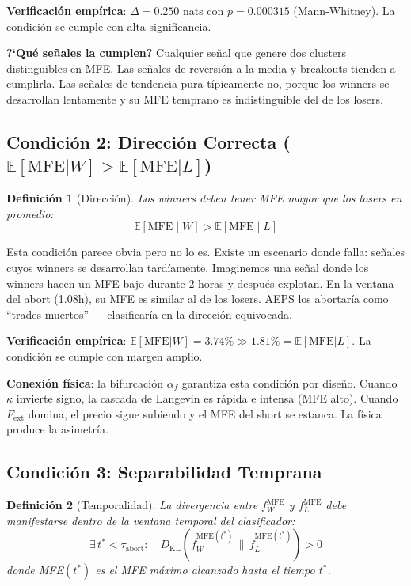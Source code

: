 \documentclass[11pt,a4paper]{article}
\newtheorem{definition}{Definici\'on}[section]
\newcommand{\E}{\mathbb{E}}
\newcommand{\KL}{D_{\mathrm{KL}}}
\newcommand{\af}{\alpha_f}
\begin{document}
\textbf{Verificaci\'on emp\'irica}: $\Delta = 0.250$ nats con
$p = 0.000315$ (Mann-Whitney). La condici\'on se cumple con alta
significancia.

\textbf{?`Qu\'e se\~nales la cumplen?} Cualquier se\~nal que genere
dos clusters distinguibles en MFE. Las se\~nales de reversi\'on a
la media y breakouts tienden a cumplirla. Las se\~nales de tendencia
pura t\'ipicamente no, porque los winners se desarrollan lentamente
y su MFE temprano es indistinguible del de los losers.


\subsection{Condici\'on 2: Direcci\'on Correcta ($\E[\text{MFE}|W] > \E[\text{MFE}|L]$)}

\begin{definition}[Direcci\'on]
Los winners deben tener MFE mayor que los losers en promedio:
\begin{equation}
\E[\text{MFE} \mid W] > \E[\text{MFE} \mid L]
\end{equation}
\end{definition}

Esta condici\'on parece obvia pero no lo es. Existe un escenario
donde falla: se\~nales cuyos winners se desarrollan tard\'iamente.
Imaginemos una se\~nal donde los winners hacen un MFE bajo durante
2 horas y despu\'es explotan. En la ventana del abort (1.08h), su
MFE es similar al de los losers. AEPS los abortar\'ia como ``trades
muertos'' --- clasificar\'ia en la direcci\'on equivocada.

\textbf{Verificaci\'on emp\'irica}: $\E[\text{MFE}|W] = 3.74\%
\gg 1.81\% = \E[\text{MFE}|L]$. La condici\'on se cumple con
margen amplio.

\textbf{Conexi\'on f\'isica}: la bifurcaci\'on $\af$ garantiza
esta condici\'on por dise\~no. Cuando $\kappa$ invierte signo,
la cascada de Langevin es r\'apida e intensa (MFE alto). Cuando
$F_{\text{ext}}$ domina, el precio sigue subiendo y el MFE del
short se estanca. La f\'isica produce la asimetr\'ia.


\subsection{Condici\'on 3: Separabilidad Temprana}

\begin{definition}[Temporalidad]
La divergencia entre $f_W^{\text{MFE}}$ y $f_L^{\text{MFE}}$ debe
manifestarse dentro de la ventana temporal del clasificador:
\begin{equation}
\exists\, t^* < \tau_{\text{abort}}: \quad
\KL\!\left(f_W^{\text{MFE}(t^*)} \,\|\, f_L^{\text{MFE}(t^*)}\right) > 0
\end{equation}
donde MFE$(t^*)$ es el MFE m\'aximo alcanzado hasta el tiempo $t^*$.
\end{definition}
\end{document}
